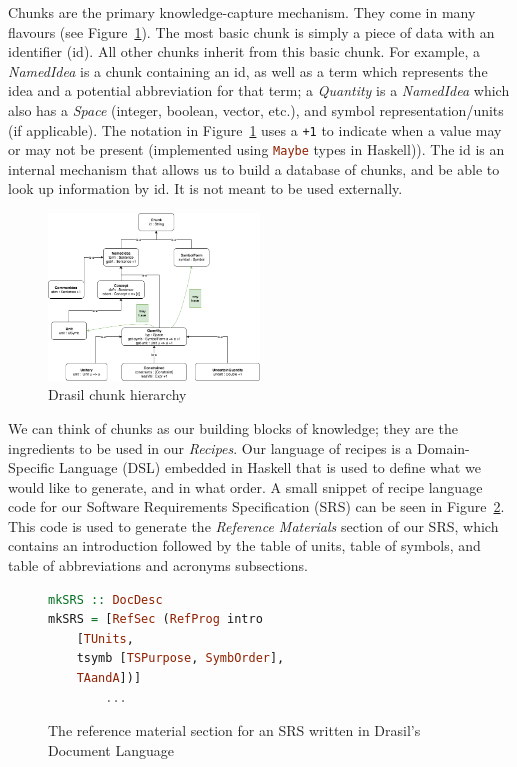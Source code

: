 \documentclass[sigconf]{acmart}
\newcommand{\inlHask}[1]{\lstinline[language=Haskell, columns=fullflexible,
  basicstyle=\ttfamily, showstringspaces=false, breaklines=true]{#1}}
\begin{document}
Chunks are the primary knowledge-capture mechanism. They come in many flavours
(see Figure~\ref{hierarchy}). The most basic chunk is simply a 
piece of data with an identifier (id). All other chunks inherit from this
basic chunk.  For example, a \textit{NamedIdea} is a chunk containing an id, 
as well as a term which represents the idea and a potential abbreviation for 
that term; a \textit{Quantity} is a \textit{NamedIdea}
which also has a \textit{Space} (integer, boolean, vector, etc.), 
and symbol representation/units (if applicable).  The notation in
Figure~\ref{hierarchy} uses a \verb|+1| to indicate when a value may or
may not be present (implemented using 
\inlHask{Maybe} types in Haskell)).  The id is an internal
mechanism that allows us to build a database of chunks, and be able to
look up information by id. It is not meant to be used externally.

\begin{figure}
    \centering
    \includegraphics[width=0.5\textwidth]{figures/class_hierarchy.png}
    \caption{Drasil chunk hierarchy}
    \label{hierarchy}
\end{figure}

We can think of chunks as our building blocks of knowledge; they are the 
ingredients to be used in our \textit{Recipes}. Our language of recipes is a 
Domain-Specific Language (DSL) embedded in Haskell that is used to define what 
we would like to generate, and in what order. A small snippet of recipe 
language code for our Software Requirements Specification (SRS) can be seen in 
Figure~\ref{recipeLang}. This code is used to generate the \textit{Reference 
Materials} section of our SRS, which contains an introduction followed by the 
table of units, table of symbols, and table of abbreviations and acronyms 
subsections.

\begin{figure}
\begin{lstlisting}[language=Haskell, frame=single, showstringspaces=false, basicstyle=\small]
mkSRS :: DocDesc 
mkSRS = [RefSec (RefProg intro 
    [TUnits, 
    tsymb [TSPurpose, SymbOrder], 
    TAandA])]
        ...
\end{lstlisting}
\caption{The reference material section for an SRS written in Drasil's Document 
Language}
\label{recipeLang}
\end{figure}
\end{document}
